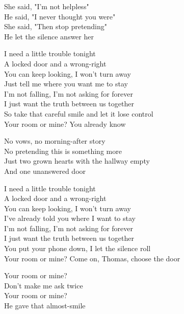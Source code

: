 \begin{lyrics}
She said, "I'm not helpless"\\
He said, "I never thought you were"\\
She said, "Then stop pretending"\\
He let the silence answer her

I need a little trouble tonight\\
A locked door and a wrong-right\\
You can keep looking, I won't turn away\\
Just tell me where you want me to stay\\
I'm not falling, I'm not asking for forever\\
I just want the truth between us together\\
So take that careful smile and let it lose control\\
Your room or mine? You already know

No vows, no morning-after story\\
No pretending this is something more\\
Just two grown hearts with the hallway empty\\
And one unanswered door

I need a little trouble tonight\\
A locked door and a wrong-right\\
You can keep looking, I won't turn away\\
I've already told you where I want to stay\\
I'm not falling, I'm not asking for forever\\
I just want the truth between us together\\
You put your phone down, I let the silence roll\\
Your room or mine? Come on, Thomas, choose the door

Your room or mine?\\
Don't make me ask twice\\
Your room or mine?\\
He gave that almost-smile
\end{lyrics}

